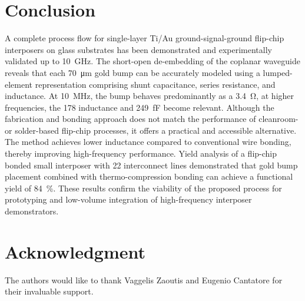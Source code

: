 \documentclass[conference,a4paper]{IEEEtran}
\begin{document}
\section{Conclusion}
A complete process flow for single-layer Ti/Au ground-signal-ground flip-chip interposers on glass substrates has been demonstrated and experimentally validated up to \SI{10}{GHz}. The short-open de-embedding of the coplanar waveguide reveals that each \SI{70}{\micro\metre} gold bump can be accurately modeled using a lumped-element representation comprising shunt capacitance, series resistance, and inductance. At \SI{10}{MHz}, the bump behaves predominantly as a \SI{3.4}{\ohm}, at higher frequencies, the \SI{178}{\pH} inductance and \SI{249}{\fF} become relevant.
Although the fabrication and bonding approach does not match the performance of cleanroom- or solder-based flip-chip processes, it offers a practical and accessible alternative. The method achieves lower inductance compared to conventional wire bonding, thereby improving high-frequency performance.
Yield analysis of a flip-chip bonded small interposer with 22 interconnect lines demonstrated that gold bump placement combined with thermo-compression bonding can achieve a functional yield of \SI{84}{\percent}. These results confirm the viability of the proposed process for prototyping and low-volume integration of high-frequency interposer demonstrators.


\section*{Acknowledgment}
The authors would like to thank Vaggelis Zaoutis and Eugenio Cantatore for their invaluable support.



\end{document}
